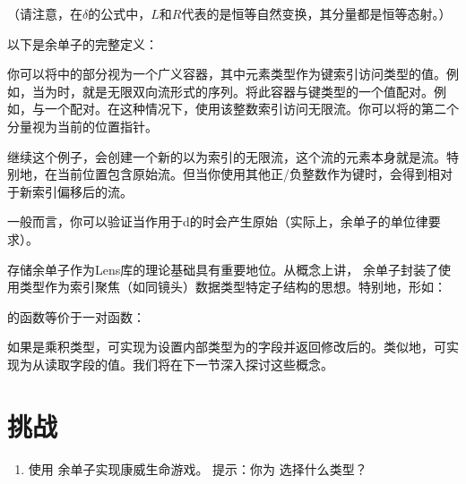 （请注意，在$\delta$的公式中，$L$和$R$代表的是恒等自然变换，其分量都是恒等态射。）

以下是余单子的完整定义：

你可以将中的部分视为一个广义容器，其中元素类型作为键索引访问类型的值。例如，当为时，就是无限双向流形式的序列。将此容器与键类型的一个值配对。例如，与一个配对。在这种情况下，使用该整数索引访问无限流。你可以将的第二个分量视为当前的位置指针。

继续这个例子，会创建一个新的以为索引的无限流，这个流的元素本身就是流。特别地，在当前位置包含原始流。但当你使用其他正/负整数作为键时，会得到相对于新索引偏移后的流。

一般而言，你可以验证当作用于d的时会产生原始（实际上，余单子的单位律要求）。

存储余单子作为Lens库的理论基础具有重要地位。从概念上讲，
余单子封装了使用类型作为索引聚焦（如同镜头）数据类型特定子结构的思想。特别地，形如：

的函数等价于一对函数：

如果是乘积类型，可实现为设置内部类型为的字段并返回修改后的。类似地，可实现为从读取字段的值。我们将在下一节深入探讨这些概念。

\section{挑战}

\begin{enumerate}
  \tightlist
  \item
        使用  余单子实现康威生命游戏。
        提示：你为  选择什么类型？
\end{enumerate}